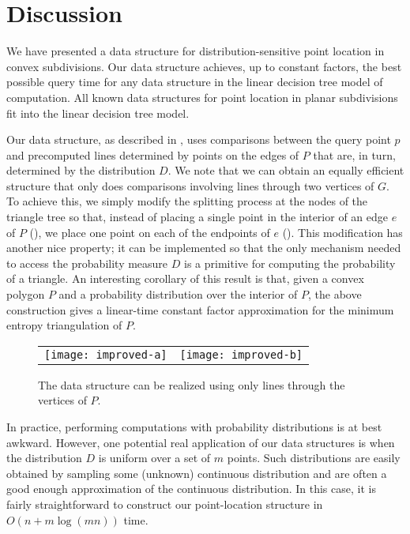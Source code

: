 \documentclass[charterfonts,lotsofwhite]{patmorin}
\begin{document}
\section{Discussion}

We have presented a data structure for distribution-sensitive point
location in convex subdivisions.  Our data structure achieves, up to
constant factors, the best possible query time for any data structure
in the linear decision tree model of computation.  All known data
structures for point location in planar subdivisions fit into the
linear decision tree model. 

Our data structure, as described in , uses
comparisons between the query point $p$ and precomputed lines
determined by points on the edges of $P$ that are, in turn, determined
by the distribution $D$.  We note that we can obtain an equally
efficient structure that only does comparisons involving lines through
two vertices of $G$.  To achieve this, we simply modify the splitting
process at the nodes of the triangle tree so that, instead of placing
a single point in the interior of an edge $e$ of $P$ (),
we place one point on each of the endpoints of $e$
(). This modification has another nice
property; it can be implemented so that the only mechanism needed to
access the probability measure $D$ is a primitive for computing the
probability of a triangle.  An interesting corollary of this result is
that, given a convex polygon $P$ and a probability distribution over
the interior of $P$, the above construction gives a linear-time
constant factor approximation for the minimum entropy triangulation of
$P$.

\begin{figure}
\begin{center}\begin{tabular}{cc}
\texttt{[image: improved-a]} & \texttt{[image: improved-b]}
\end{tabular}
\end{center}
\caption{The data structure can be realized using only lines through
the vertices of $P$.}
\end{figure}

In practice, performing computations with probability distributions is
at best awkward.  However, one potential real application of our data
structures is when the distribution $D$ is uniform over a set of $m$
points.  Such distributions are easily obtained by sampling some
(unknown) continuous distribution and are often a good enough
approximation of the continuous distribution.  In this case, it is
fairly straightforward to construct our point-location structure in
$O(n+ m\log(mn))$ time.
\end{document}

